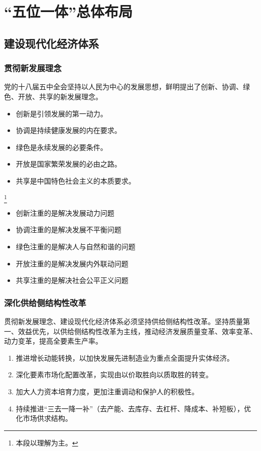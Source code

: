 \chapter{“五位一体”总体布局}

\section{建设现代化经济体系}
    \subsection{贯彻新发展理念}
        党的十八届五中全会坚持以人民为中心的发展思想，鲜明提出了创新、协调、绿色、开放、共享的新发展理念。

        \begin{itemize}
            \item 创新是引领发展的第一动力。
            \item 协调是持续健康发展的内在要求。
            \item 绿色是永续发展的必要条件。
            \item 开放是国家繁荣发展的必由之路。
            \item 共享是中国特色社会主义的本质要求。
        \end{itemize}

        \footnote{本段以理解为主。}
        \begin{itemize}
            \item 创新注重的是解决发展动力问题
            \item 协调注重的是解决发展不平衡问题
            \item 绿色注重的是解决人与自然和谐的问题
            \item 开放注重的是解决发展内外联动问题
            \item 共享注重的是解决社会公平正义问题
        \end{itemize}

    \subsection{深化供给侧结构性改革}
        贯彻新发展理念、建设现代化经济体系必须坚持供给侧结构性改革。坚持质量第一、效益优先，以供给侧结构性改革为主线，推动经济发展质量变革、效率变革、动力变革，提高全要素生产率。

        \begin{enumerate}
            \item 推进增长动能转换，以加快发展先进制造业为重点全面提升实体经济。
            \item 深化要素市场化配置改革，实现由以价取胜向以质取胜的转变。
            \item 加大人力资本培育力度，更加注重调动和保护人的积极性。
            \item 持续推进“三去一降一补”（去产能、去库存、去杠杆、降成本、补短板），优化市场供求结构。
        \end{enumerate}

